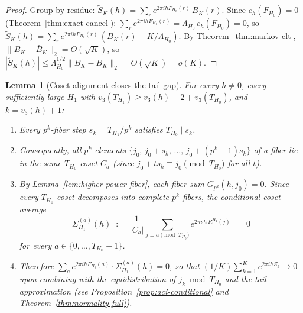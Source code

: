 \documentclass[
]{article}
\newtheorem{lemma}[theorem]{Lemma}
\begin{document}
\begin{proof}
Group by residue:
$\tilde S_K(h) = \sum_r e^{2\pi i h F_{H_0}(r)}\,B_K(r)$.
Since $c_h(F_{H_0}) = 0$ (Theorem~\ref{thm:exact-cancel}):
$\sum_r e^{2\pi i h F_{H_0}(r)} = \Lambda_{H_0}\,c_h(F_{H_0}) = 0$,
so $\tilde S_K(h) = \sum_r e^{2\pi i h F_{H_0}(r)}\,(B_K(r) - K/\Lambda_{H_0})$.
By Theorem~\ref{thm:markov-clt}, $\|B_K - \bar B_K\|_2 = O(\sqrt{K})$,
so $|\tilde S_K(h)| \le \Lambda_{H_0}^{1/2}\|B_K-\bar B_K\|_2 = O(\sqrt{K})=o(K)$.
\end{proof}


\begin{lemma}[Coset alignment closes the tail gap]\label{lem:coset-alignment}
For every $h\ne 0$, every sufficiently large $H_1$ with
$v_3(T_{H_1})\ge v_3(h)+2+v_3(T_{H_0})$, and
$k = v_3(h)+1$:
\begin{enumerate}
\item Every $p^k$-fiber step $s_k = T_{H_1}/p^k$ satisfies $T_{H_0}\mid s_k$.
\item Consequently, all $p^k$ elements $\{j_0,\,j_0+s_k,\,\ldots,\,j_0+(p^k-1)s_k\}$
  of a fiber lie in the \emph{same} $T_{H_0}$-coset $C_a$
  (since $j_0+t s_k\equiv j_0\pmod{T_{H_0}}$ for all $t$).
\item By Lemma~\ref{lem:higher-power-fiber}, each fiber sum
  $G_{p^k}(h,j_0)=0$.  Since every $T_{H_0}$-coset decomposes into
  complete $p^k$-fibers, the conditional coset average
  \[
    \Sigma_{H_1}^{(a)}(h)
    \;:=\;\frac{1}{|C_a|}\sum_{j\equiv a\pmod{T_{H_0}}}e^{2\pi i\,h\,R^{H_1}(j)}
    \;=\;0
  \]
  for every $a\in\{0,\ldots,T_{H_0}-1\}$.
\item Therefore $\sum_{a} e^{2\pi i h F_{H_0}(a)}\cdot\Sigma_{H_1}^{(a)}(h)=0$,
  so that $(1/K)\sum_{k=1}^K e^{2\pi i h Z_k}\to 0$
  upon combining with the equidistribution of $j_k\bmod T_{H_0}$
  and the tail approximation (see Proposition~\ref{prop:aci-conditional}
  and Theorem~\ref{thm:normality-full}).
\end{enumerate}
\end{lemma}
\end{document}
